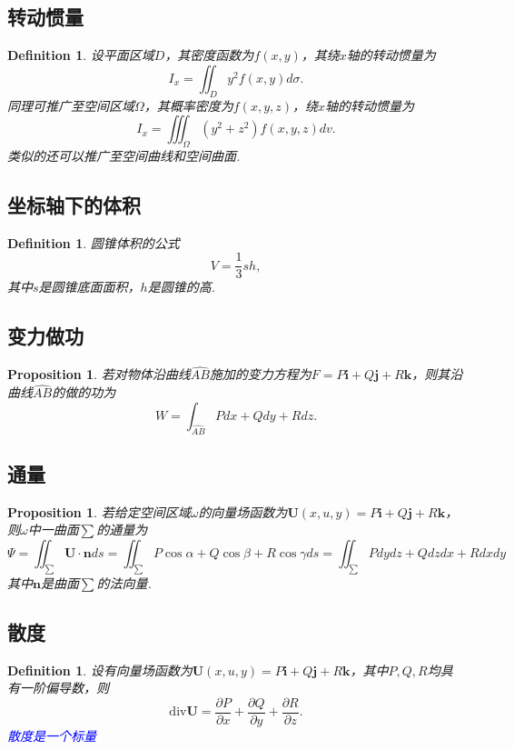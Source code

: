 \documentclass{article}
\newcommand{\mbf}[1]{\bm{#1}}
\newtheorem{proposition}[theorem]{Proposition}
\newtheorem{definition}[theorem]{Definition}
\newcommand{\bluet}[1]{\textcolor{blue}{#1}}
\begin{document}
\subsection{转动惯量}

\begin{definition}
\rm 设平面区域$D$，其密度函数为$f(x,y)$，其绕$x$轴的转动惯量为
$$
I_x = \iint_D y^2 f(x,y)d\sigma.
$$
同理可推广至空间区域$\Omega$，其概率密度为$f(x,y,z)$，绕$x$轴的转动惯量为
$$
I_x = \iiint_\Omega (y^2+z^2) f(x,y,z)dv.
$$
类似的还可以推广至空间曲线和空间曲面. 
\end{definition}

\subsection{坐标轴下的体积}

\begin{definition}
\rm 圆锥体积的公式
$$
V = \frac{1}{3}sh,
$$
其中$s$是圆锥底面面积，$h$是圆锥的高. 
\end{definition}

\subsection{变力做功}

\begin{proposition}
\rm 若对物体沿曲线$\widehat{AB}$施加的变力方程为$F = P\mbf{i}+Q\mbf{j}+R\mbf{k}$，则其沿曲线$\widehat{AB}$的做的功为
$$
W = \int_{\widehat{AB}}  Pdx+Qdy+Rdz. 
$$
\end{proposition}

\subsection{通量}

\begin{proposition}
\rm 若给定空间区域$\omega$的向量场函数为$\mbf{U}(x,u,y)=P\mbf{i}+Q\mbf{j}+R\mbf{k}$，则$\omega$中一曲面$\sum$的通量为
$$
\Psi = \iint_\sum \mbf{U}\cdot \mbf{n} ds= \iint_\sum P\cos\alpha+Q\cos\beta+R\cos\gamma ds  = \iint_\sum Pdydz + Qdzdx + Rdxdy
$$
其中$\mbf{n}$是曲面$\sum$的法向量. 
\end{proposition}

\subsection{散度}

\begin{definition}
\rm 设有向量场函数为$\mbf{U}(x,u,y)=P\mbf{i}+Q\mbf{j}+R\mbf{k}$，其中$P,Q,R$均具有一阶偏导数，则
$$
\text{div} \mbf{U} = \frac{\partial P}{\partial x} + \frac{\partial Q}{\partial y} + \frac{\partial R}{\partial z}.
$$
\bluet{散度是一个标量}
\end{definition}
\end{document}
